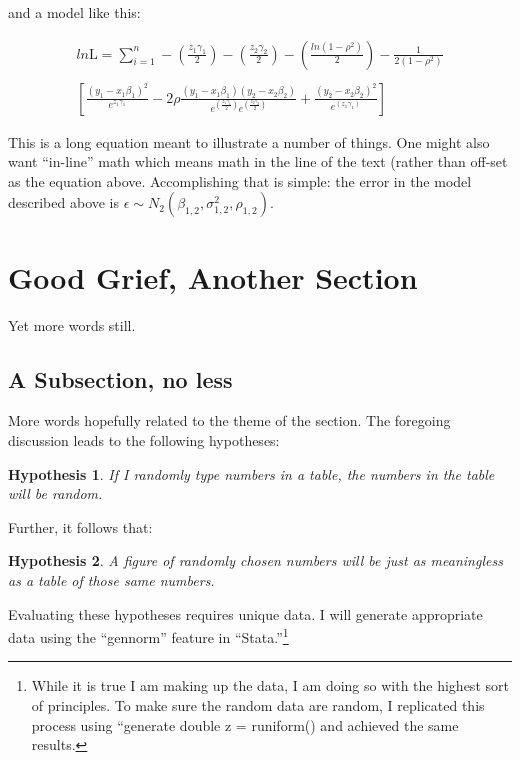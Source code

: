 \documentclass[12pt]{article}
\newtheorem{hyp}{Hypothesis}
\begin{document}
and a model like this:
 
\begin{eqnarray}
ln \text{L} = \sum\limits_{i=1}^{n} -\left(\frac{z_1\gamma_1}{2}\right) - \left(\frac{z_2\gamma_2}{2}\right) - \left(\frac{ln(1-\rho^2)}{2}\right) - \frac{1}{2(1-\rho^2)}   \nonumber \\ \nonumber \\
\left[ \frac{(y_1-x_1\beta_1)^2}{e^{z_1\gamma_1}} - 2\rho\frac{(y_1-x_1\beta_1)(y_2-x_2\beta_2)}{e^{\left(\frac{z_1\gamma_1}{2}\right)} e^{\left(\frac{z_2\gamma_2}{2}\right)}} +   \frac{(y_2-x_2\beta_2)^2}{e^{(z_1\gamma_1)}}\right] \nonumber
\end{eqnarray}

This is a long equation meant to illustrate a number of things. One might also want ``in-line'' math which means math in the line of the text (rather than off-set as the equation above. Accomplishing that is simple: the error in the model described above is $\epsilon \sim N_{2} (\beta_{1,2}, \sigma^{2}_{1,2}, \rho_{1,2})$. 


  
\section*{Good Grief, Another Section}
Yet more words still.

\subsection*{A Subsection, no less}
More words hopefully related to the theme of the section. The foregoing discussion leads to the following hypotheses:

\begin{hyp}
If I randomly type numbers in a table, the numbers in the table will be random.
\end{hyp}

Further, it follows that: 

\begin{hyp}
A figure of randomly chosen numbers will be just as meaningless as a table of those same numbers.
\end{hyp}

Evaluating these hypotheses requires unique data. I will generate appropriate data using the ``{\sf gennorm}'' feature in ``{\sf Stata}.''\footnote{While it is true I am making up the data, I am doing so with the highest sort of principles. To make sure the random data are random, I replicated this process using ``{\sf generate double z = runiform()} and achieved the same results. }
\end{document}
